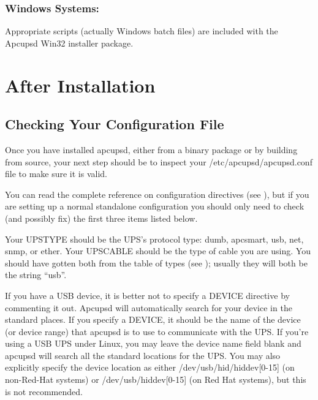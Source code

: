 \subsubsection*{Windows Systems:}
Appropriate scripts (actually Windows batch files) are included with the
Apcupsd Win32 installer package.

\label{After-Installation}

\section*{After Installation}

\label{index-After-Installation-57}
\label{index-Installation_002c-After-installing-58}

\label{Checking-Your-Configuration-File}

\subsection*{Checking Your Configuration File}

\label{index-Checking-Conf-file-59}
Once you have installed apcupsd, either from a binary package or by building
from source, your next step should be to inspect your
/etc/apcupsd/apcupsd.conf file to make sure it is valid.  

You can read the complete reference on configuration directives (see 
), but if you are
setting up a normal standalone configuration you should only need to check
(and possibly fix) the first three items listed below.  

Your UPSTYPE should be the UPS's protocol type: dumb, apcsmart, usb, net,
snmp, or ether.  Your UPSCABLE should be the type of cable you are using.  You
should have gotten both from the table of types (see 
); usually they will both be the
string ``usb''.  

If you have a USB device, it is better not to specify a DEVICE directive by
commenting it out. Apcupsd will automatically search for your device in the
standard places. If you specify a DEVICE, it should be the name of the device
(or device range) that apcupsd is to use to communicate with the UPS.  If
you're using a USB UPS under Linux, you may leave the device name field blank
and apcupsd will search all the standard locations for the UPS. You may also
explicitly specify the device location as either /dev/usb/hid/hiddev[0-15] (on
non-Red-Hat systems) or /dev/usb/hiddev[0-15] (on Red Hat systems), but this
is not recommended.  

